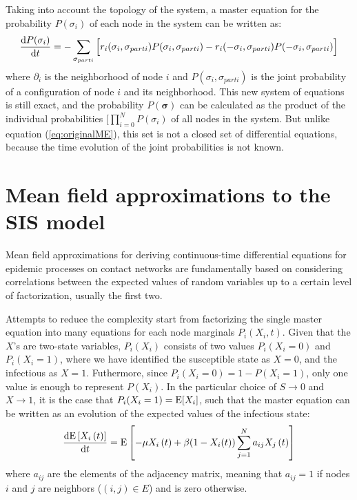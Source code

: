 Taking into account the topology of the system, a master equation for the probability $P (\sigma_i)$ of each node in the system can be written as:  
\begin{eqnarray}
\frac{\mathrm{d} P (\sigma_i) }{\mathrm{d} t} = - \sum_{\sigma_{part i}} \Big[
r_i(\sigma_i, \sigma_{part i}) P(\sigma_i, \sigma_{part i})
-  r_i(-\sigma_i, \sigma_{part i}) 
P(-\sigma_i, \sigma_{part i}) \Big]
\label{eq:CMEPi_pij} 
\end{eqnarray}
where $\partial_i$ is the neighborhood of node $i$ and $P(\sigma_i, \sigma_{part i})$ is the joint probability of a configuration of node $i$ and its neighborhood. This new system of equations is still exact, and the probability $P(\bm{\sigma})$ can be calculated as the product of the individual probabilities $\big[ \prod_{i=0}^N P(\sigma_i)$ of all nodes in the system. But unlike equation (\ref{eq:originalME}), this set is not a closed set of differential equations, because the time evolution of the joint probabilities is not known.


\section{Mean field approximations to the SIS model} \label{sec:MF}

Mean field approximations for deriving continuous-time differential equations for epidemic processes on contact networks are fundamentally based on considering correlations between the expected values of random variables up to a certain level of factorization, usually the first two.



Attempts to reduce the complexity start from factorizing the single master equation into many equations for each node marginals $P_i(X_i,t)$. Given that the $X$'s are two-state variables, $P_i(X_i)$ consists of two values $P_i(X_i = 0)$ and $P_i(X_i = 1)$, where we have identified the susceptible state as $X=0$, and the infectious as $X=1$. Futhermore, since $P_i(X_i=0) = 1 - P(X_i=1)$, only one value is enough to represent $P(X_i)$. In the particular choice of $S\to 0$ and $X \to 1$, it is the case that $P_i(X_i=1) = \mathrm{E} [X_i] $, such that the master equation can be written as an evolution of the expected values of the infectious state: 
\begin{equation}
\frac{\mathrm{d} \mathrm{E}\left[  X_{i}\left(  t\right)  \right]  }{\mathrm{d} t}  =\mathrm{E}\left[  -\mu
X_{i}\left(  t\right)  +\beta (1-X_i(t))   
\sum_{j=1}^{N}a_{ij}X_{j}\left(  t\right)  \right]
\label{eq:meanXdt}
\end{equation}
where $a_{ij}$ are the elements of the adjacency matrix, meaning that $a_{ij} = 1$ if nodes $i$ and $j$ are neighbors ($(i,j)\in E$) and is zero otherwise.

